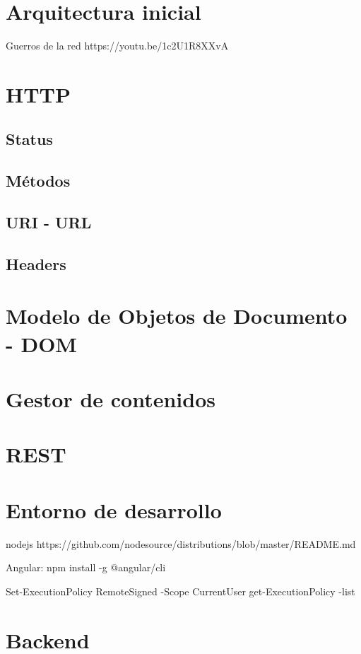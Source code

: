 \section{Arquitectura inicial}

Guerros de la red
https://youtu.be/1c2U1R8XXvA

\section{HTTP}
\subsection{Status}
\subsection{Métodos}
\subsection{URI - URL}
\subsection{Headers}

\section{Modelo de Objetos de Documento - DOM}

\section{Gestor de contenidos}

\section{REST}

\section{Entorno de desarrollo}

nodejs
https://github.com/nodesource/distributions/blob/master/README.md

Angular: npm install -g @angular/cli

Set-ExecutionPolicy RemoteSigned -Scope CurrentUser
get-ExecutionPolicy -list

\section{Backend}
